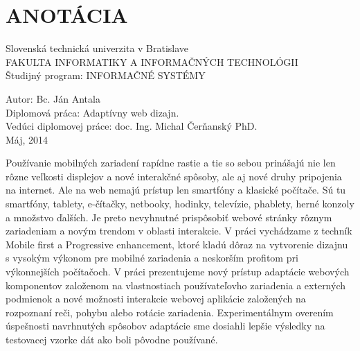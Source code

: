 
\newpage


%



\section*{ANOTÁCIA}
\thispagestyle{empty}
Slovenská technická univerzita v Bratislave\\
FAKULTA INFORMATIKY A INFORMAČNÝCH TECHNOLÓGII\\
Študijný program: INFORMAČNÉ SYSTÉMY
\newline

Autor: Bc. Ján Antala\\
Diplomová práca: Adaptívny web dizajn.\\ 
Vedúci diplomovej práce: doc. Ing. Michal Čerňanský PhD. \\
Máj, 2014
\newline

Používanie mobilných zariadení rapídne rastie a tie so sebou prinášajú nie len rôzne veľkosti displejov a nové interakčné spôsoby, ale aj nové druhy pripojenia na internet. Ale na web nemajú prístup len smartfóny a klasické počítače. Sú tu smartfóny, tablety, e-čítačky, netbooky, hodinky, televízie, phablety, herné konzoly a množstvo ďalších. Je preto nevyhnutné prispôsobiť webové stránky rôznym zariadeniam a novým trendom v oblasti interakcie.
V práci vychádzame z techník Mobile first a Progressive enhancement, ktoré kladú dôraz na vytvorenie dizajnu s vysokým výkonom pre mobilné zariadenia a neskorším profitom pri výkonnejších počítačoch. V práci prezentujeme nový prístup adaptácie webových komponentov založenom na vlastnostiach používateľovho zariadenia a externých podmienok a nové možnosti interakcie webovej aplikácie založených na rozpoznaní reči, pohybu alebo rotácie zariadenia.
Experimentálnym overením úspešnosti navrhnutých spôsobov adaptácie sme dosiahli lepšie výsledky na testovacej vzorke dát ako boli pôvodne používané.

